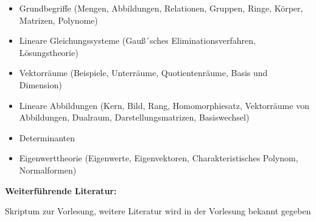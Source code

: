 \begin{course}
\begin{content}
\begin{itemize}\item Grundbegriffe (Mengen, Abbildungen, Relationen, Gruppen, Ringe, Körper, Matrizen, Polynome)   \item Lineare Gleichungssysteme (Gauß´sches Eliminationsverfahren, Lösungstheorie)   \item Vektorräume (Beispiele, Unterräume, Quotientenräume, Basis und Dimension)   \item Lineare Abbildungen (Kern, Bild, Rang, Homomorphiesatz, Vektorräume von Abbildungen, Dualraum, Darstellungsmatrizen, Basiswechsel)   \item Determinanten   \item Eigenwerttheorie (Eigenwerte, Eigenvektoren, Charakteristisches Polynom, Normalformen)   \end{itemize}
\end{content}



\begin{literature}\textbf{Weiterführende Literatur:}

Skriptum zur Vorlesung,\newline
weitere Literatur wird in der Vorlesung bekannt gegeben

\end{literature}



\end{course}